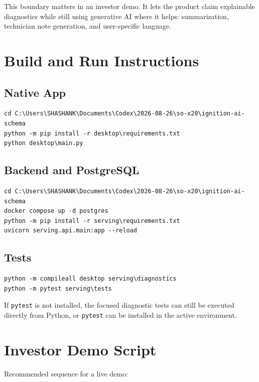 \documentclass[11pt,a4paper]{article}
\begin{document}
This boundary matters in an investor demo. It lets the product claim explainable diagnostics while still using generative AI where it helps: summarization, technician note generation, and user-specific language.

\section{Build and Run Instructions}

\subsection{Native App}

\begin{lstlisting}
cd C:\Users\SHASHANK\Documents\Codex\2026-08-26\so-x20\ignition-ai-schema
python -m pip install -r desktop\requirements.txt
python desktop\main.py
\end{lstlisting}

\subsection{Backend and PostgreSQL}

\begin{lstlisting}
cd C:\Users\SHASHANK\Documents\Codex\2026-08-26\so-x20\ignition-ai-schema
docker compose up -d postgres
python -m pip install -r serving\requirements.txt
uvicorn serving.api.main:app --reload
\end{lstlisting}

\subsection{Tests}

\begin{lstlisting}
python -m compileall desktop serving\diagnostics
python -m pytest serving\tests
\end{lstlisting}

If \texttt{pytest} is not installed, the focused diagnostic tests can still be executed directly from Python, or \texttt{pytest} can be installed in the active environment.

\section{Investor Demo Script}

Recommended sequence for a live demo:
\end{document}
